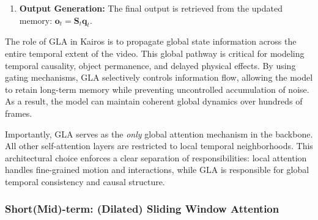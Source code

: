 \documentclass{llmxive}
\begin{document}
\begin{enumerate}
Specifically, a decay gate $\alpha_t \in (0,1)$ is computed as:
\begin{equation}
\alpha_t = \sigma(\mathbf{W}_\alpha \mathbf{x}_t)
\end{equation}

The state update is then modified as:
\begin{equation}
\mathbf{S}_t =
\alpha_t \mathbf{S}_{t-1}
- \mathbf{v}_t^{\text{old}} \mathbf{k}_t^\top
+ \mathbf{v}_t^{\text{new}} \mathbf{k}_t^\top
\end{equation}

Equivalently, this can be written as:
\begin{equation}
\mathbf{S}_t =
\alpha_t \mathbf{S}_{t-1}
+ \beta_t (\mathbf{v}_t - \mathbf{v}_t^{\text{old}}) \mathbf{k}_t^\top
\end{equation}

Here, $\alpha_t$ acts as a forget gate that globally scales the previous memory state, enabling the model to discard outdated information more efficiently. Combined with the local delta correction term, this gated update provides both precise associative correction and adaptive long-term memory control.

\item \textbf{Output Generation:} The final output is retrieved from the updated memory: $\mathbf{o}_t = \mathbf{S}_t \mathbf{q}_t$.


\end{enumerate}

The role of GLA in Kairos is to propagate global state information across the entire temporal extent of the video. This global pathway is critical for modeling temporal causality, object permanence, and delayed physical effects. By using gating mechanisms, GLA selectively controls information flow, allowing the model to retain long-term memory while preventing uncontrolled accumulation of noise. As a result, the model can maintain coherent global dynamics over hundreds of frames.

Importantly, GLA serves as the \emph{only} global attention mechanism in the backbone. All other self-attention layers are restricted to local temporal neighborhoods. This architectural choice enforces a clear separation of responsibilities: local attention handles fine-grained motion and interactions, while GLA is responsible for global temporal consistency and causal structure.


\subsubsection{ Short(Mid)-term: (Dilated) Sliding Window Attention}
\end{document}
